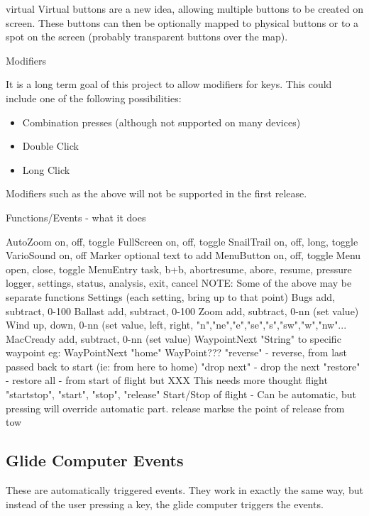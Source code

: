 virtual		Virtual buttons are a new idea, allowing
multiple buttons to be created on screen.
These buttons can then be optionally mapped
to physical buttons or to a spot on the
screen (probably transparent buttons over
the map).

Modifiers

It is a long term goal of this project to allow modifiers for keys.
This could include one of the following possibilities:

\begin{itemize}
\item Combination presses (although not supported on many devices)
\item Double Click
\item Long Click
\end{itemize}

Modifiers such as the above will not be supported in the first release.

\begin{verb}
Functions/Events - what it does

AutoZoom		on, off, toggle
FullScreen		on, off, toggle
SnailTrail 		on, off, long, toggle
VarioSound 		on, off
Marker 			optional text to add
MenuButton 		on, off, toggle
Menu			open, close, toggle
MenuEntry		task, b+b, abortresume, abore, resume, pressure
logger, settings, status, analysis, exit, cancel
NOTE: Some of the above may be separate functions
Settings		(each setting, bring up to that point)
Bugs			add, subtract, 0-100%
Ballast			add, subtract, 0-100%
Zoom			add, subtract, 0-nn (set value)
Wind			up, down, 0-nn (set value, left, right, "n","ne","e","se","s","sw","w","nw"...
MacCready		add, subtract, 0-nn (set value)
WaypointNext		"String" to specific waypoint
eg: WayPointNext "home"
WayPoint???		"reverse" - reverse, from last passed back to start (ie: from here to home)
"drop next" - drop the next
"restore" - restore all - from start of flight but
XXX This needs more thought
flight 			"startstop", "start", "stop", "release"
Start/Stop of flight - Can be automatic, but pressing will override
automatic part.
release 		markse the point of release from tow
\end{verb}

\subsection{Glide Computer Events}

These are automatically triggered events. They work in exactly the
same way, but instead of the user pressing a key, the glide computer
triggers the events.

